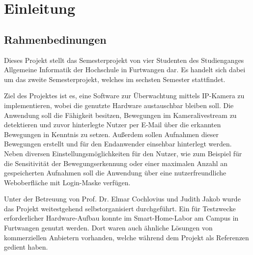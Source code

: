 \chapter{Einleitung}
\section{Rahmenbedinungen}
Dieses Projekt stellt das Semesterprojekt von vier Studenten des Studienganges Allgemeine Informatik der Hochschule in Furtwangen dar. Es handelt sich dabei um das zweite Semesterprojekt, welches im sechsten Semester stattfindet. 

Ziel des Projektes ist es, eine Software zur Überwachtung mittels \acs{IP}-Kamera zu implementieren, wobei die genutzte Hardware austauschbar bleiben soll. Die Anwendung soll die Fähigkeit besitzen, Bewegungen im Kameralivestream zu detektieren und zuvor hinterlegte Nutzer per E-Mail über die erkannten Bewegungen in Kenntnis zu setzen. Außerdem sollen Aufnahmen dieser Bewegungen erstellt und für den Endanwender einsehbar hinterlegt werden. Neben diversen Einstellungsmöglichkeiten für den Nutzer, wie zum Beispiel für die Sensitivität der Bewegungserkennung oder einer maximalen Anzahl an gespeicherten Aufnahmen soll die Anwendung über eine nutzerfreundliche Weboberfläche mit Login-Maske verfügen.

Unter der Betreuung von Prof. Dr. Elmar Cochlovius und Judith Jakob wurde das Projekt weitestgehend selbstorganisiert durchgeführt. Ein für Testzwecke erforderlicher Hardware-Aufbau konnte im Smart-Home-Labor am Campus in Furtwangen genutzt werden. Dort waren auch ähnliche Lösungen von kommerziellen Anbietern vorhanden, welche während dem Projekt als Referenzen gedient haben.